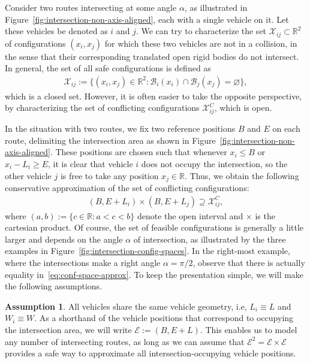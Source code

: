 \documentclass[a4paper]{report}
\newcounter{mycomment}
\newcommand{\comment}[2][]{%
    \refstepcounter{mycomment}%
    {%
        \setstretch{0.7}%
        \StrLeft{#2}{60}[\shortcaption]%
        \todo[%
        color={red!100!green!33},%
        size=\small,%
        caption={\protect\hypertarget{todo\themycomment}{}\textit{\thesubsection}%
        \hspace{1.0em}{\shortcaption}~\textit{[\themycomment]}}, #1]%
        {%
        #2~\hyperlink{todo\themycomment}{\textit{[\themycomment]}}}
    }%
}
\theoremstyle{definition}
\newtheorem{assump}{Assumption}[chapter]
\theoremstyle{plain}
\begin{document}
Consider two routes intersecting at some angle $\alpha$, as illustrated in
Figure~\ref{fig:intersection-non-axis-aligned}, each with a single vehicle on
it. Let these vehicles be denoted as $i$ and $j$.
%
We can try to characterize the set $\mathcal{X}_{ij} \subset \mathbb{R}^{2}$ of
configurations $(x_{i}, x_{j})$ for which these two vehicles are not in
a collision, in the sense that their corresponding translated open rigid bodies
do not intersect.
%
In general, the set of all safe configurations is defined as
\begin{align}
  \label{eq:3}
  \mathcal{X}_{ij} := \{ (x_{i}, x_{j}) \in \mathbb{R}^{2} : \mathcal{B}_{i}(x_{i}) \cap \mathcal{B}_{j}(x_{j}) = \varnothing \} ,
\end{align}
which is a closed set.
%
However, it is often easier to take the opposite perspective, by characterizing
the set of conflicting configurations $\mathcal{X}_{ij}^{C}$, which is open.

%
In the situation with two routes, we fix two reference positions $B$ and $E$ on
each route, delimiting the intersection area as shown in
Figure~\ref{fig:intersection-non-axis-aligned}.
%
These positions are chosen such that whenever $x_{i} \leq B$ or
$x_{i} - L_{i} \geq E$, it is clear that vehicle $i$ does not occupy the
intersection, so the other vehicle $j$ is free to take any position
$x_{j} \in \mathbb{R}$.
%
Thus, we obtain the following conservative approximation of the set of conflicting
configurations:
\begin{align}\label{eq:conf-space-approx}
  (B,E + L_{i}) \times (B, E + L_{j}) \supseteq \mathcal{X}_{ij}^{C} ,
\end{align}
where $(a, b) := \{ c\in \mathbb{R} : a < c < b\}$ denote the open interval and
$\times$ is the cartesian product.
%
Of course, the set of feasible configurations is generally a little larger and
depends on the angle $\alpha$ of intersection, as illustrated by the three examples
in Figure~\ref{fig:intersection-config-spaces}.
%
In the right-most example, where the intersections make a right angle
$\alpha = \pi/2$, observe that there is actually equality in~\eqref{eq:conf-space-approx}.
%
To keep the presentation simple, we will make the following assumptions.

\begin{assump}
  All vehicles share the same vehicle geometry, i.e, $L_{i} \equiv L$ and
  $W_{i} \equiv W$. As a shorthand of the vehicle positions that correspond to
  occupying the intersection area, we will write $\mathcal{E} := (B, E + L)$.
  This enables us to model any number of intersecting routes, as long as we can
  assume that $\mathcal{E}^2 = \mathcal{E} \times \mathcal{E}$ provides a safe
  way to approximate all intersection-occupying vehicle positions.
\end{assump}
\end{document}
